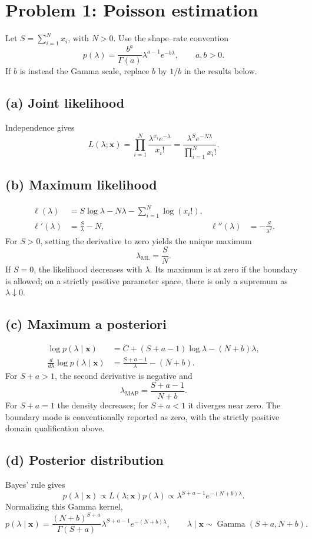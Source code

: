 \documentclass[10pt]{article}
\begin{document}
\section*{Problem 1: Poisson estimation}
Let $S=\sum_{i=1}^N x_i$, with $N>0$. Use the shape--rate convention
\[
p(\lambda)=\frac{b^a}{\Gamma(a)}\lambda^{a-1}e^{-b\lambda},\qquad a,b>0.
\]
If $b$ is instead the Gamma scale, replace $b$ by $1/b$ in the results below.
\subsection*{(a) Joint likelihood}
Independence gives
\[
L(\lambda;\mathbf{x})=\prod_{i=1}^N\frac{\lambda^{x_i}e^{-\lambda}}{x_i!}
=\frac{\lambda^S e^{-N\lambda}}{\prod_{i=1}^N x_i!}.
\]
\subsection*{(b) Maximum likelihood}
\begin{align*}
\ell(\lambda)&=S\log\lambda-N\lambda-\sum_{i=1}^N\log(x_i!),\\
\ell'(\lambda)&=\frac{S}{\lambda}-N, &
\ell''(\lambda)&=-\frac{S}{\lambda^2}.
\end{align*}
For $S>0$, setting the derivative to zero yields the unique maximum
\[\lambda_{\mathrm{ML}}=\frac{S}{N}.\]
If $S=0$, the likelihood decreases with $\lambda$. Its maximum is at zero if the boundary is allowed; on a strictly positive parameter space, there is only a supremum as $\lambda\downarrow0$.
\subsection*{(c) Maximum a posteriori}
\begin{align*}
\log p(\lambda\mid\mathbf{x})&=C+(S+a-1)\log\lambda-(N+b)\lambda,\\
\frac{d}{d\lambda}\log p(\lambda\mid\mathbf{x})&=\frac{S+a-1}{\lambda}-(N+b).
\end{align*}
For $S+a>1$, the second derivative is negative and
\[\lambda_{\mathrm{MAP}}=\frac{S+a-1}{N+b}.\]
For $S+a=1$ the density decreases; for $S+a<1$ it diverges near zero. The boundary mode is conventionally reported as zero, with the strictly positive domain qualification above.
\subsection*{(d) Posterior distribution}
Bayes' rule gives
\[
p(\lambda\mid\mathbf{x})\propto L(\lambda;\mathbf{x})p(\lambda)
\propto\lambda^{S+a-1}e^{-(N+b)\lambda}.
\]
Normalizing this Gamma kernel,
\[
p(\lambda\mid\mathbf{x})=\frac{(N+b)^{S+a}}{\Gamma(S+a)}\lambda^{S+a-1}e^{-(N+b)\lambda},
\qquad \lambda\mid\mathbf{x}\sim\operatorname{Gamma}(S+a,N+b).
\]
\end{document}
